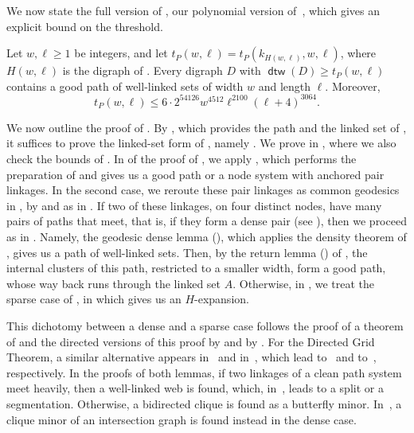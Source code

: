 \documentclass[fontsize=12pt,leading=14pt]{fullpaper}
\DeclareMathOperator{\dtw}{\mathsf{dtw}}
\newcommand{\Hwl}{H(w,\ell)}
\newcounter{step}
\begin{document}
We now state the full version of , our polynomial version of~\cite[Theorem~9.9]{HKMM26a}, which gives an explicit bound on the threshold.

\begin{theorem}[manual-num=\ref*{thm:intro-stage1}, note={Stage~1, full version}]\label{thm:stage1}
  Let $w,\ell\ge1$ be integers, and let $t_P(w,\ell)=t_P(k_{\Hwl},w,\ell)$, where $\Hwl$ is the digraph of .
  Every digraph $D$ with $\dtw(D)\ge t_P(w,\ell)$ contains a good path of well-linked sets of width $w$ and length $\ell$.
  Moreover,
  \[
    t_P(w,\ell)\le6\cdot2^{54126}w^{4512}\ell^{2100}(\ell+4)^{3064}.
  \]
\end{theorem}

We now outline the proof of .
By , which provides the path and the linked set of , it suffices to prove the linked-set form of , namely .
We prove  in , where we also check the bounds of .
In  of the proof of , we apply , which performs the preparation of  and gives us a good path or a node system with anchored pair linkages.
In the second case, we reroute these pair linkages as common geodesics in , by  and as in .
If two of these linkages, on four distinct nodes, have many pairs of paths that meet, that is, if they form a dense pair (see ), then we proceed as in .
Namely, the geodesic dense lemma (), which applies the density theorem of , gives us a path of well-linked sets.
Then, by the return lemma () of , the internal clusters of this path, restricted to a smaller width, form a good path, whose way back runs through the linked set $A$.
Otherwise, in , we treat the sparse case of , in which  gives us an $H$-expansion.

This dichotomy between a dense and a sparse case follows the proof of a theorem of \textcite[Theorem~1.2]{RW12} and the directed versions of this proof by \textcite[lemmas~3.1 and~3.3]{MPRS22} and by \textcite[Lemma~5.3]{CLNS26}.
For the Directed Grid Theorem, a similar alternative appears in~\cite[Lemma~4.8]{KawarabayashiK15} and in~\cite[Lemma~5.13]{HKMM26a}, which lead to~\cite[Theorem~4.2]{KawarabayashiK15} and to~\cite[Theorem~5.14]{HKMM26a}, respectively.
In the proofs of both lemmas, if two linkages of a clean path system meet heavily, then a well-linked web is found, which, in~\cite{HKMM26a}, leads to a split or a segmentation.
Otherwise, a bidirected clique is found as a butterfly minor.
In~\cite{RW12,MPRS22,CLNS26}, a clique minor of an intersection graph is found instead in the dense case.
\end{document}
